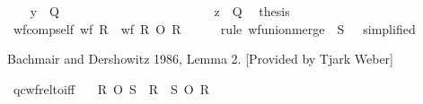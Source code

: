 \begin{isabellebody}
\ {}\ \isamarkupfalse%
\ {\isachardoublequoteopen}y\ {\isasymnotin}\ Q{\isachardoublequoteclose}\ \isacommand{{\isachardot}{\kern0pt}}\isamarkupfalse%
\isanewline
\ \ \ \ \ \ \ \ \isamarkupfalse%
\isanewline
\ \ \ \ \ \ \isamarkupfalse%
\isanewline
\ \ \ \ \ \ \isamarkupfalse%
\ {\isacartoucheopen}z{\isacharprime}{\kern0pt}\ {\isasymin}\ Q{\isacartoucheclose}\ \isamarkupfalse%
\ {\isacharquery}{\kern0pt}thesis\ \isacommand{{\isachardot}{\kern0pt}{\isachardot}{\kern0pt}}\isamarkupfalse%
\isanewline
\ \ \ \ \isamarkupfalse%
\isanewline
\ \ \isamarkupfalse%
\isanewline
{}\isamarkupfalse%
%
\endisatagproof
{\isafoldproof}%
%
\isadelimproof
\isanewline
%
\endisadelimproof
\isanewline
{}\isamarkupfalse%
\ wf{\isacharunderscore}{\kern0pt}comp{\isacharunderscore}{\kern0pt}self{\isacharcolon}{\kern0pt}\ {\isachardoublequoteopen}wf\ R\ {\isasymlongleftrightarrow}\ wf\ {\isacharparenleft}{\kern0pt}R\ O\ R{\isacharparenright}{\kern0pt}{\isachardoublequoteclose}\ \ %
\isanewline
%
\isadelimproof
\ \ %
\endisadelimproof
%
\isatagproof
{}\isamarkupfalse%
\ {\isacharparenleft}{\kern0pt}rule\ wf{\isacharunderscore}{\kern0pt}union{\isacharunderscore}{\kern0pt}merge\ {\isacharbrackleft}{\kern0pt}\ S\ {\isacharequal}{\kern0pt}\ {\isachardoublequoteopen}{\isacharbraceleft}{\kern0pt}{\isacharbraceright}{\kern0pt}{\isachardoublequoteclose}{\isacharcomma}{\kern0pt}\ simplified{\isacharbrackright}{\kern0pt}{\isacharparenright}{\kern0pt}%
\endisatagproof
{\isafoldproof}%
%
\isadelimproof
%
\endisadelimproof
%
\isadelimdocument
%
\endisadelimdocument
%
\isatagdocument
%
\isamarkuptrue%
%
\endisatagdocument
{\isafolddocument}%
%
\isadelimdocument
%
\endisadelimdocument
%
\begin{isamarkuptext}%
Bachmair and Dershowitz 1986, Lemma 2. [Provided by Tjark Weber]%
\end{isamarkuptext}\isamarkuptrue%
\isamarkupfalse%
\ qc{\isacharunderscore}{\kern0pt}wf{\isacharunderscore}{\kern0pt}relto{\isacharunderscore}{\kern0pt}iff{\isacharcolon}{\kern0pt}\isanewline
\ \ \ {\isachardoublequoteopen}R\ O\ S\ {\isasymsubseteq}\ {\isacharparenleft}{\kern0pt}R\ {\isasymunion}\ S{\isacharparenright}{\kern0pt}\isactrlsup {\isacharasterisk}{\kern0pt}\ O\ R{\isachardoublequoteclose}\ %
\isanewline

\end{isabellebody}
